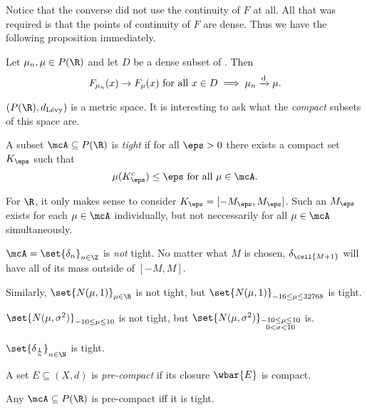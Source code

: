 \begin{remark}
    Notice that the converse did not use the continuity of $F$ at all.
    All that was required is that the points of continuity of $F$ are dense.
    Thus we have the following proposition immediately.
\end{remark}
\begin{proposition}
    Let $\mu_n, \mu \in P(\R)$ and let $D$ be a dense subset of \R.
    Then \[
        F_{\mu_n}(x) \to F_\mu(x) \text{ for all } x \in D
        \implies \mu_n \xrightarrow{\text{d}} \mu.
    \]
\end{proposition}

$(P(\R), d_{\text{L\'evy}})$ is a metric space.
It is interesting to ask what the \emph{compact} subsets of this space are.

\begin{definition}
    A subset $\mcA \subseteq P(\R)$ is \emph{tight} if for all $\eps > 0$
    there exists a compact set $K_\eps$ such that \[
        \mu(K_\eps^c) \le \eps \text{ for all } \mu \in \mcA.
    \]
\end{definition}
For $\R$, it only makes sense to consider $K_\eps = [-M_\eps, M_\eps]$.
Such an $M_\eps$ exists for each $\mu \in \mcA$ individually, but not
neccessarily for all $\mu \in \mcA$ simultaneously.
\begin{examples}
    \item $\mcA = \set{\delta_n}_{n \in \Z}$ is \emph{not} tight.
        No matter what $M$ is chosen, $\delta_{\ceil{M+1}}$ will have all
        of its mass outside of $[-M, M]$.
    \item Similarly, $\set{N(\mu, 1)}_{\mu \in \R}$ is not tight,
        but $\set{N(\mu, 1)}_{-16 \le \mu \le 32768}$ is tight.
    \item $\set{N(\mu, \sigma^2)}_{-10 \le \mu \le 10}$ is not tight, but
        $\set{N(\mu, \sigma^2)}_{\substack{-10 \le \mu \le 10 \\
                                0 < \sigma < 10}}$ is.
    \item $\set{\delta_{\frac1n}}_{n \in \N}$ is tight.
\end{examples}

\begin{definition}
    A set $E \subseteq (X, d)$ is \emph{pre-compact} if its closure
    $\wbar{E}$ is compact.
\end{definition}
\begin{theorem*}
    Any $\mcA \subseteq P(\R)$ is pre-compact iff it is tight.
\end{theorem*}

